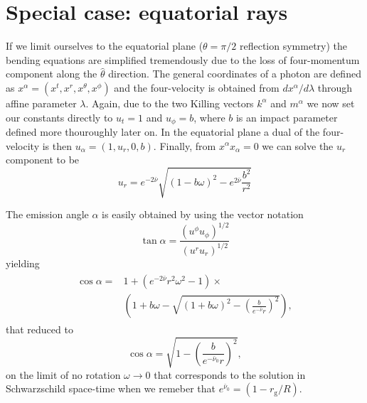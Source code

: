 \documentclass[iop, usenatbib]{emulateapj}
\newcommand{\be}{\begin{equation}}
\newcommand{\ee}{\end{equation}}
\newcommand{\rg}{\ensuremath{r_{\mathrm{g}}}}
\newcommand{\sch}{Schwarzschild }
\newcommand{\nub}{\ensuremath{\bar{\nu}}}
\begin{document}
\section{Special case: equatorial rays}
If we limit ourselves to the equatorial plane ($\theta=\pi/2$ reflection symmetry) the bending equations are simplified tremendously due to the loss of four-momentum component along the $\hat{\theta}$ direction.
The general coordinates of a photon are defined as $x^{\alpha} = (x^{t}, x^{r}, x^{\theta}, x^{\phi})$ and the four-velocity is obtained from $dx^{\alpha}/d\lambda$ through affine parameter $\lambda$.
Again, due to the two Killing vectors $k^{\alpha}$ and $m^{\alpha}$ we now set our constants directly to $u_{t} = 1$ and $u_{\phi} = b$, where $b$ is an impact parameter defined more thouroughly later on.
In the equatorial plane a dual of the four-velocity is then $u_{\alpha} = (1, u_{r}, 0, b)$.
Finally, from $x^{\alpha}x_{\alpha} = 0$ we can solve the $u_{r}$ component to be
\be
u_{r} = e^{-2\nub}\sqrt{(1-b\omega)^2 - e^{2\nub}\frac{b^2}{r^2}} 
\ee

The emission angle $\alpha$ is easily obtained by using the vector notation
\be
\tan \alpha = \frac{(u^{\phi}u_{\phi})^{1/2}}{(u^ru_r)^{1/2}}
\ee
yielding
\begin{align}\begin{split}
\cos \alpha = & 1 + (e^{-2\nub}r^2\omega^2 -1) \times \\
            & \left( 1+b\omega - \sqrt{(1+b\omega)^2 - \left(\frac{b}{e^{-\nub}r}\right)^2} \right),
\end{split}\end{align}
that reduced to 
\be
\cos \alpha = \sqrt{1-\left( \frac{b}{e^{-\nub_0}r} \right)^2},
\ee
on the limit of no rotation $\omega \rightarrow 0$ that corresponds to the solution in \sch space-time when we remeber that $e^{\nub_0} = (1-\rg/R)$.
\end{document}
